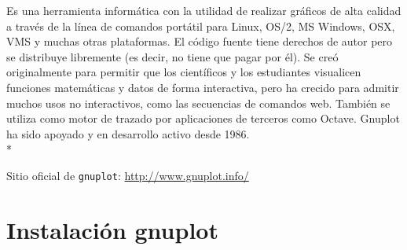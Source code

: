 \documentclass[11.5pt,a4paper]{article}
\begin{document}
Es una herramienta informática con la utilidad de realizar gráficos de alta calidad a través de la línea de comandos portátil para Linux, OS/2, MS Windows, OSX, VMS y muchas otras plataformas. El código fuente tiene derechos de autor pero se distribuye libremente (es decir, no tiene que pagar por él). Se creó originalmente para permitir que los científicos y los estudiantes visualicen funciones matemáticas y datos de forma interactiva, pero ha crecido para admitir muchos usos no interactivos, como las secuencias de comandos web. También se utiliza como motor de trazado por aplicaciones de terceros como Octave. Gnuplot ha sido apoyado y en desarrollo activo desde 1986.\\* 

Sitio oficial de \texttt{gnuplot}: \url{http://www.gnuplot.info/} 


\section{Instalación gnuplot}
\end{document}
